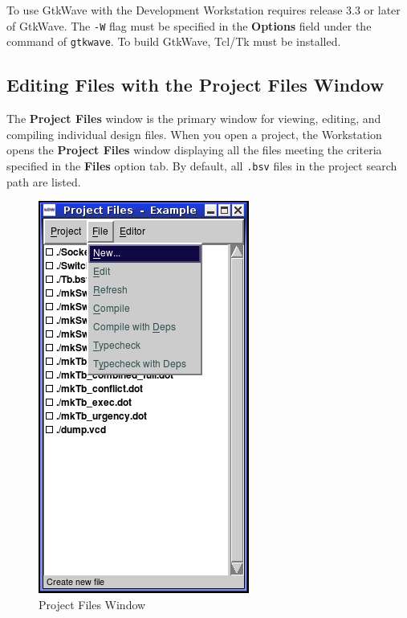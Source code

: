 \documentclass{article}
\newcommand{\te}[1]{\texttt{#1}}
\begin{document}
To use GtkWave with the Development Workstation requires release 3.3 or later of GtkWave.
The \te{-W} flag must be specified in the {\bf Options} field  under
the command of \te{gtkwave}.  To build GtkWave, Tcl/Tk must be
installed.  


\subsection{Editing Files with the Project Files Window}
\label{project-window}

The {\bf Project Files} window is the primary window for viewing,
editing, and compiling individual design files.  When you open a project, the
Workstation opens the {\bf Project Files}  window displaying  all the
files  meeting the criteria specified in the {\bf Files} option tab.  By default, all
\te{.bsv} files in the project search path  are listed.




\begin{figure}[ht]
\begin{center}
\includegraphics[height = 2.4 in]{figures/projectfiles_menu}
\caption{Project Files Window}
\label{fig-projectfiles}
\end{center}
\end{figure}
\end{document}
